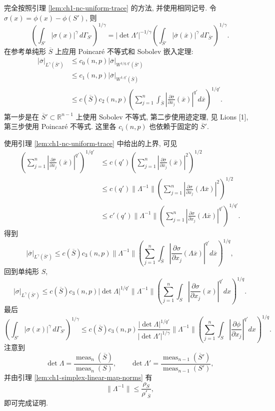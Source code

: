 \begin{Proof}
完全按照引理 \ref{lem:ch1-nc-uniform-trace} 的方法, 并使用相同记号. 令 $\sigma(x)=\phi(x)-\phi(S')$, 则
\[
\left(\int_{S'}|\sigma(x)|^\gamma\,d\Gamma_{S'}\right)^{1/\gamma}
=|\det\Lambda'|^{-1/\gamma}
\left(\int_{\overline S'}|\overline\sigma(\overline x)|^\gamma
\,d\Gamma_{\overline S'}\right)^{1/\gamma}.
\]
在参考单纯形 $\overline S$ 上应用 Poincaré 不等式和 Sobolev 嵌入定理:
\[
\begin{aligned}
|\overline\sigma|_{L^\gamma(\overline S')}
&\leq c_0(n,p)|\overline\sigma|_{W^{1/q,q'}(\overline S')}\\
&\leq c_1(n,p)|\overline\sigma|_{W^{1,q'}(\overline S)}\\
&\leq c(\overline S)c_2(n,p)
\left(\sum_{j=1}^n\int_{\overline S}
\left|\frac{\partial\overline\sigma}{\partial\overline x_j}(\overline x)\right|^{q'}d\overline x\right)^{1/q'}.
\end{aligned}
\]
第一步是在 $\overline S'\subset\mathbb R^{n-1}$ 上使用 Sobolev 不等式, 第二步使用迹定理, 见 Lions [1], 第三步使用 Poincaré 不等式. 这里各 $c_i(n,p)$ 也依赖于固定的 $\overline S'$.

使用引理 \ref{lem:ch1-nc-uniform-trace} 中给出的上界, 可见
\[
\begin{aligned}
\left(\sum_{j=1}^n\left|\frac{\partial\overline\sigma}{\partial\overline x_j}(\overline x)\right|^{q'}\right)^{1/q'}
&\leq c(q')\left(\sum_{j=1}^n\left|\frac{\partial\overline\sigma}{\partial\overline x_j}(\overline x)\right|^2\right)^{1/2}\\
&\leq c(q')\|\Lambda^{-1}\|
\left(\sum_{j=1}^n\left|\frac{\partial\sigma}{\partial x_j}(\Lambda\overline x)\right|^2\right)^{1/2}\\
&\leq c'(q')\|\Lambda^{-1}\|
\left(\sum_{j=1}^n\left|\frac{\partial\sigma}{\partial x_j}(\Lambda\overline x)\right|^{q'}\right)^{1/q'}.
\end{aligned}
\]
得到
\[
|\overline\sigma|_{L^\gamma(\overline S')}
\leq c(\overline S)c_3(n,p)\|\Lambda^{-1}\|
\left(\sum_{j=1}^n\int_{\overline S}
\left|\frac{\partial\sigma}{\partial x_j}(\Lambda\overline x)\right|^{q'}d\overline x\right)^{1/q},
\]
回到单纯形 $S$,
\[
|\sigma|_{L^\gamma(\overline S')}
\leq c(\overline S)c_3(n,p)|\det\Lambda|^{1/q'}
\|\Lambda^{-1}\|
\left(\sum_{j=1}^n\int_S
\left|\frac{\partial\sigma}{\partial x_j}(x)\right|^{q'}dx\right)^{1/q}.
\]
最后
\[
\left(\int_{S'}|\sigma(x)|^\gamma\,d\Gamma_{S'}\right)^{1/\gamma}
\leq c(\overline S)c_3(n,p)
\frac{|\det\Lambda|^{1/q'}}{|\det\Lambda'|^{1/\gamma}}
\|\Lambda^{-1}\|
\left(\sum_{j=1}^n\int_S
\left|\frac{\partial\phi}{\partial x_j}\right|^{q'}dx\right)^{1/q}.
\]
注意到
\[
\det\Lambda=\frac{\operatorname{meas}_n(\overline S)}{\operatorname{meas}_n(S)},
\qquad
\det\Lambda'=\frac{\operatorname{meas}_{n-1}(\overline S')}
{\operatorname{meas}_{n-1}(S')},
\]
并由引理 \ref{lem:ch1-simplex-linear-map-norms} 有
\[
\|\Lambda^{-1}\|\leq\frac{\rho_S}{\rho'_{\overline S}},
\]
即可完成证明.
\end{Proof}

